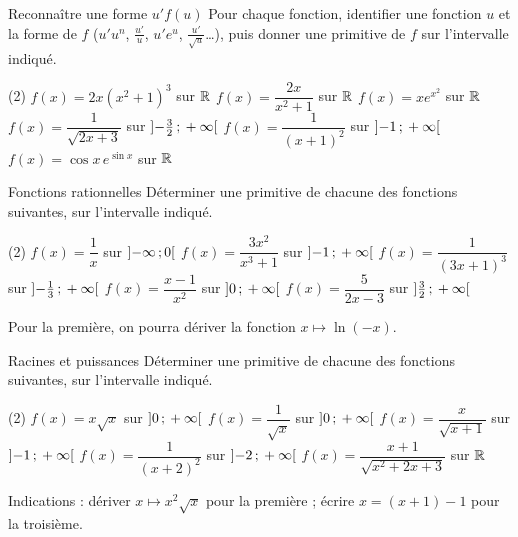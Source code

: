 \begin{exercice}[2]{Reconnaître une forme $u'f(u)$}
Pour chaque fonction, identifier une fonction $u$ et la forme de $f$ ($u'u^{n}$, $\frac{u'}{u}$, $u'e^{u}$, $\frac{u'}{\sqrt u}$…),
puis donner une primitive de $f$ sur l'intervalle indiqué.
\begin{tasks}(2)
  \task $f(x)=2x\left(x^{2}+1\right)^{3}$ sur $\mathbb{R}$
  \task $f(x)=\dfrac{2x}{x^{2}+1}$ sur $\mathbb{R}$
  \task $f(x)=xe^{x^{2}}$ sur $\mathbb{R}$
  \task $f(x)=\dfrac{1}{\sqrt{2x+3}}$ sur $\mathopen{]}-\frac32\,{;}\,+\infty\mathclose{[}$
  \task $f(x)=\dfrac{1}{(x+1)^{2}}$ sur $\mathopen{]}-1\,{;}\,+\infty\mathclose{[}$
  \task $f(x)=\cos x\,e^{\sin x}$ sur $\mathbb{R}$
\end{tasks}
\end{exercice}

\begin{exercice}[2]{Fonctions rationnelles}
Déterminer une primitive de chacune des fonctions suivantes, sur l'intervalle indiqué.
\begin{tasks}(2)
  \task $f(x)=\dfrac1x$ sur $\mathopen{]}-\infty\,{;}\,0\mathclose{[}$
  \task $f(x)=\dfrac{3x^{2}}{x^{3}+1}$ sur $\mathopen{]}-1\,{;}\,+\infty\mathclose{[}$
  \task $f(x)=\dfrac{1}{(3x+1)^{3}}$ sur $\mathopen{]}-\frac13\,{;}\,+\infty\mathclose{[}$
  \task $f(x)=\dfrac{x-1}{x^{2}}$ sur $\mathopen{]}0\,{;}\,+\infty\mathclose{[}$
  \task $f(x)=\dfrac{5}{2x-3}$ sur $\mathopen{]}\frac32\,{;}\,+\infty\mathclose{[}$
\end{tasks}
Pour la première, on pourra dériver la fonction $x\mapsto\ln(-x)$.
\end{exercice}

\begin{exercice}[2]{Racines et puissances}
Déterminer une primitive de chacune des fonctions suivantes, sur l'intervalle indiqué.
\begin{tasks}(2)
  \task $f(x)=x\sqrt x$ sur $\mathopen{]}0\,{;}\,+\infty\mathclose{[}$
  \task $f(x)=\dfrac{1}{\sqrt x}$ sur $\mathopen{]}0\,{;}\,+\infty\mathclose{[}$
  \task $f(x)=\dfrac{x}{\sqrt{x+1}}$ sur $\mathopen{]}-1\,{;}\,+\infty\mathclose{[}$
  \task $f(x)=\dfrac{1}{(x+2)^{2}}$ sur $\mathopen{]}-2\,{;}\,+\infty\mathclose{[}$
  \task $f(x)=\dfrac{x+1}{\sqrt{x^{2}+2x+3}}$ sur $\mathbb{R}$
\end{tasks}
Indications : dériver $x\mapsto x^{2}\sqrt x$ pour la première ; écrire $x=(x+1)-1$ pour la troisième.
\end{exercice}

